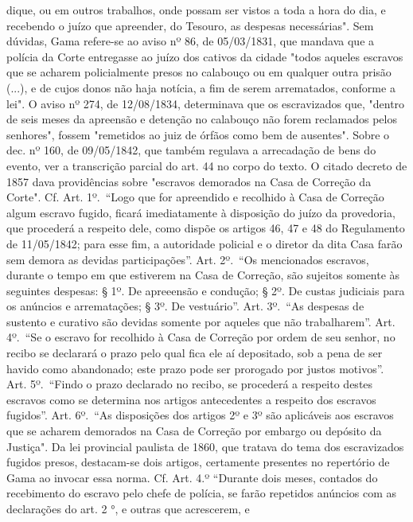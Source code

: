 {  dique, ou em outros trabalhos, onde possam ser vistos a toda a hora do
  dia, e recebendo o juízo que apreender, do Tesouro, as despesas
  necessárias". Sem dúvidas, Gama refere-se ao aviso nº 86, de
  05/03/1831, que mandava que a polícia da Corte entregasse ao juízo dos
  cativos da cidade "todos aqueles escravos que se acharem policialmente
  presos no calabouço ou em qualquer outra prisão (...), e de cujos
  donos não haja notícia, a fim de serem arrematados, conforme a lei". O
  aviso nº 274, de 12/08/1834, determinava que os escravizados que,
  "dentro de seis meses da apreensão e detenção no calabouço não forem
  reclamados pelos senhores", fossem "remetidos ao juiz de órfãos como
  bem de ausentes". Sobre o dec. nº 160, de 09/05/1842, que também
  regulava a arrecadação de bens do evento, ver a transcrição parcial do
  art. 44 no corpo do texto. O citado decreto de 1857 dava providências
  sobre "escravos demorados na Casa de Correção da Corte". Cf. Art.
  1º.~``Logo que for apreendido e recolhido à Casa de Correção algum
  escravo fugido, ficará imediatamente à disposição do juízo da
  provedoria, que procederá a respeito dele, como dispõe os artigos 46,
  47 e 48 do Regulamento de 11/05/1842; para esse fim, a autoridade
  policial e o diretor da dita Casa farão sem demora as devidas
  participações''. Art. 2º.~``Os mencionados escravos, durante o tempo
  em que estiverem na Casa de Correção, são sujeitos somente às
  seguintes despesas: § 1º. De apreeensão e condução; § 2º. De custas
  judiciais para os anúncios e arrematações; § 3º. De vestuário''. Art.
  3º.~``As despesas de sustento e curativo são devidas somente por
  aqueles que não trabalharem''. Art. 4º.~``Se o escravo for recolhido à
  Casa de Correção por ordem de seu senhor, no recibo se declarará o
  prazo pelo qual fica ele aí depositado, sob a pena de ser havido como
  abandonado; este prazo pode ser prorogado por justos motivos''. Art.
  5º.~``Findo o prazo declarado no recibo, se procederá a respeito
  destes escravos como se determina nos artigos antecedentes a respeito
  dos escravos fugidos''. Art. 6º.~``As disposições dos artigos 2º e 3º
  são aplicáveis aos escravos que se acharem demorados na Casa de
  Correção por embargo ou depósito da Justiça". Da lei provincial
  paulista de 1860, que tratava do tema dos escravizados fugidos presos,
  destacam-se dois artigos, certamente presentes no repertório de Gama
  ao invocar essa norma. Cf. Art. 4.º ``Durante dois meses, contados do
  recebimento do escravo pelo chefe de polícia, se farão repetidos
  anúncios com as declarações do art. 2 °, e outras que acrescerem, e
}

